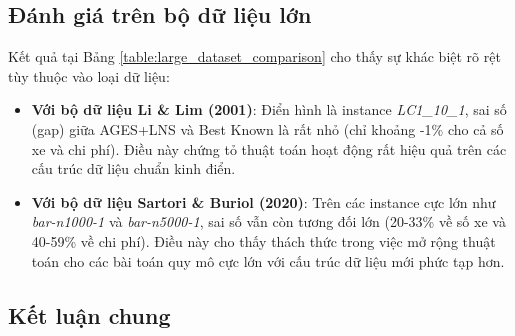 \documentclass[../DoAn.tex]{subfiles}
\begin{document}
    \subsection{Đánh giá trên bộ dữ liệu lớn}
    Kết quả tại Bảng \ref{table:large_dataset_comparison} cho thấy sự khác biệt rõ rệt tùy thuộc vào loại dữ liệu:
    \begin{itemize}
        \item \textbf{Với bộ dữ liệu Li \& Lim (2001)}: Điển hình là instance \textit{LC1\_10\_1}, sai số (gap) giữa AGES+LNS và Best Known là rất nhỏ (chỉ khoảng -1\% cho cả số xe và chi phí). Điều này chứng tỏ thuật toán hoạt động rất hiệu quả trên các cấu trúc dữ liệu chuẩn kinh điển.
        \item \textbf{Với bộ dữ liệu Sartori \& Buriol (2020)}: Trên các instance cực lớn như \textit{bar-n1000-1} và \textit{bar-n5000-1}, sai số vẫn còn tương đối lớn (20-33\% về số xe và 40-59\% về chi phí). Điều này cho thấy thách thức trong việc mở rộng thuật toán cho các bài toán quy mô cực lớn với cấu trúc dữ liệu mới phức tạp hơn.
    \end{itemize}

    \subsection{Kết luận chung}
   
\end{document}
